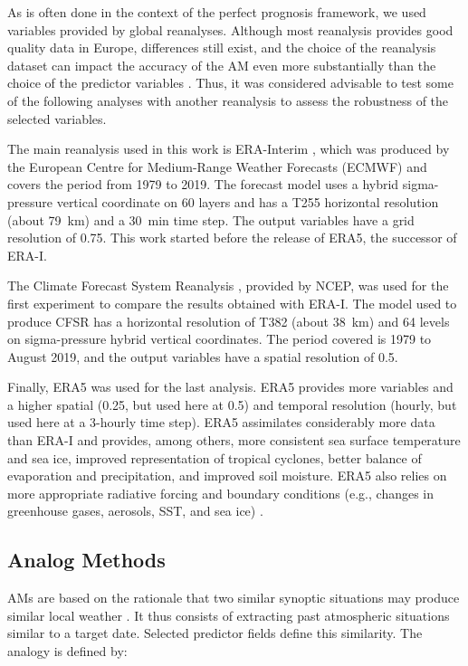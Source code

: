 \documentclass[draft]{agujournal2019}
\begin{document}
As is often done in the context of the perfect prognosis framework, we used variables provided by global reanalyses. Although most reanalysis provides good quality data in Europe, differences still exist, and the choice of the reanalysis dataset can impact the accuracy of the AM even more substantially than the choice of the predictor variables \cite{Horton2018b}. Thus, it was considered advisable to test some of the following analyses with another reanalysis to assess the robustness of the selected variables.

The main reanalysis used in this work is ERA-Interim \cite<ERA-I,>{Dee2011a}, which was produced by the European Centre for Medium-Range Weather Forecasts (ECMWF) and covers the period from 1979 to 2019. The forecast model uses a hybrid sigma-pressure vertical coordinate on 60 layers and has a T255 horizontal resolution (about 79~km) and a 30~min time step. The output variables have a grid resolution of 0.75\degree. This work started before the release of ERA5, the successor of ERA-I.

The Climate Forecast System Reanalysis \cite<CFSR,>{Saha2010a}, provided by NCEP, was used for the first experiment to compare the results obtained with ERA-I. The model used to produce CFSR has a horizontal resolution of T382 (about 38~km) and 64 levels on sigma-pressure hybrid vertical coordinates. The period covered is 1979 to August 2019, and the output variables have a spatial resolution of 0.5\degree.

Finally, ERA5 \cite{Hersbach2019} was used for the last analysis. ERA5 provides more variables and a higher spatial (0.25\degree, but used here at 0.5\degree) and temporal resolution (hourly, but used here at a 3-hourly time step). ERA5 assimilates considerably more data than ERA-I and provides, among others, more consistent sea surface temperature and sea ice, improved representation of tropical cyclones, better balance of evaporation and precipitation, and improved soil moisture. ERA5 also relies on more appropriate radiative forcing and boundary conditions (e.g., changes in greenhouse gases, aerosols, SST, and sea ice) \cite{Hersbach2019}.


\subsection{Analog Methods}
\label{ams}

AMs are based on the rationale that two similar synoptic situations may produce similar local weather \cite{Lorenz1956, Lorenz1969}. It thus consists of extracting past atmospheric situations similar to a target date. Selected predictor fields define this similarity. The analogy is defined by:
\end{document}
